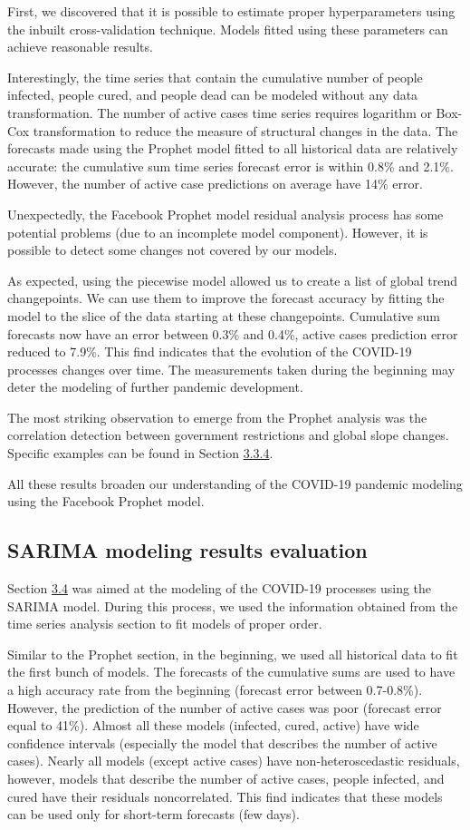 First, we discovered that it is possible to estimate proper hyperparameters using the inbuilt cross-validation technique. Models fitted using these parameters can achieve reasonable results.


Interestingly, the time series that contain the cumulative number of people infected, people cured, and people dead can be modeled without any data transformation. The number of active cases time series requires logarithm or Box-Cox transformation to reduce the measure of structural changes in the data. The forecasts made using the Prophet model fitted to all historical data are relatively accurate: the cumulative sum time series forecast error is within 0.8\% and 2.1\%. However, the number of active case predictions on average have 14\% error.  

Unexpectedly, the Facebook Prophet model residual analysis process has some potential problems (due to an incomplete model component). However, it is possible to detect some changes not covered by our models.

As expected, using the piecewise model allowed us to create a list of global trend changepoints. We can use them to improve the forecast accuracy by fitting the model to the slice of the data starting at these changepoints. Cumulative sum forecasts now have an error between 0.3\% and 0.4\%, active cases prediction error reduced to 7.9\%. This find indicates that the evolution of the COVID-19 processes changes over time. The measurements taken during the beginning may deter the modeling of further pandemic development.

The most striking observation to emerge from the Prophet analysis was the correlation detection between government restrictions and global slope changes. Specific examples can be found in Section \hyperlink{ss3.3.4}{3.3.4}.

All these results broaden our understanding of the COVID-19 pandemic modeling using the Facebook Prophet model.

\subsection{SARIMA modeling results evaluation}

Section \hyperlink{s3.4}{3.4} was aimed at the modeling of the COVID-19 processes using the SARIMA model. During this process, we used the information obtained from the time series analysis section to fit models of proper order.

Similar to the Prophet section, in the beginning, we used all historical data to fit the first bunch of models. The forecasts of the cumulative sums are used to have a high accuracy rate from the beginning (forecast error between 0.7-0.8\%). However, the prediction of the number of active cases was poor (forecast error equal to 41\%). Almost all these models (infected, cured, active) have wide confidence intervals (especially the model that describes the number of active cases). Nearly all models (except active cases) have non-heteroscedastic residuals, however, models that describe the number of active cases, people infected, and cured have their residuals noncorrelated. This find indicates that these models can be used only for short-term forecasts (few days).

